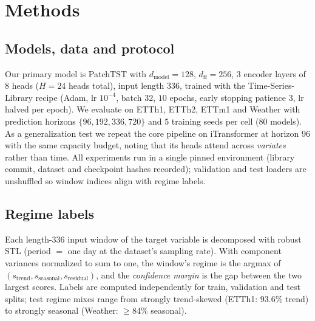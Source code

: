 
\section{Methods}
\label{sec:methods}

\subsection{Models, data and protocol}
\label{sec:methods-setup}
Our primary model is PatchTST \citep{nie2023patchtst} with
$d_{\text{model}}{=}128$, $d_{\text{ff}}{=}256$, $3$ encoder layers of
$8$ heads ($H{=}24$ heads total), input length $336$, trained with the
Time-Series-Library recipe (Adam, lr $10^{-4}$, batch $32$, $10$ epochs,
early stopping patience $3$, lr halved per epoch). We evaluate on ETTh1,
ETTh2, ETTm1 and Weather with prediction horizons
$\{96,192,336,720\}$ and $5$ training seeds per cell
($80$ models). As a generalization test we repeat the core pipeline on
iTransformer \citep{liu2024itransformer} at horizon $96$ with the same
capacity budget, noting that its heads attend across \emph{variates}
rather than time. All experiments run in a single pinned environment
(library commit, dataset and checkpoint hashes recorded); validation and
test loaders are unshuffled so window indices align with regime labels.

\subsection{Regime labels}
\label{sec:methods-regimes}
Each length-$336$ input window of the target variable is decomposed with
robust STL \citep{cleveland1990stl} (period $=$ one day at the dataset's
sampling rate). With component variances normalized to sum to one, the
window's regime is the argmax of
$(s_{\text{trend}}, s_{\text{seasonal}}, s_{\text{residual}})$, and the
\emph{confidence margin} is the gap between the two largest scores.
Labels are computed independently for train, validation and test splits;
test regime mixes range from strongly trend-skewed (ETTh1: $93.6\%$
trend) to strongly seasonal (Weather: $\geq 84\%$ seasonal).


